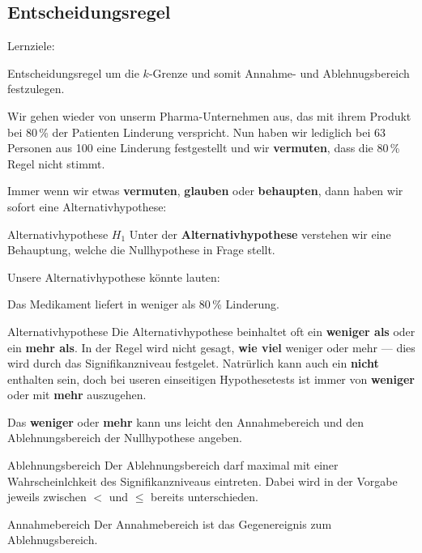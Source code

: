 
\subsection{Entscheidungsregel}
Lernziele:

Entscheidungsregel um die $k$-Grenze und somit Annahme- und
Ablehnugsbereich festzulegen.
\newpage 

Wir gehen wieder von unserm Pharma-Unternehmen aus, das mit ihrem Produkt bei 80\,\% der Patienten Linderung verspricht.
Nun haben wir lediglich bei 63 Personen aus 100 eine Linderung festgestellt und wir \textbf{vermuten}, dass die 80\,\% Regel nicht stimmt.

Immer wenn wir etwas \textbf{vermuten}, \textbf{glauben} oder \textbf{behaupten}, dann haben wir sofort eine Alternativhypothese:


\begin{definition}{Alternativhypothese $H_1$}{}
Unter der \textbf{Alternativhypothese} verstehen wir eine Behauptung, welche die Nullhypothese in Frage stellt.
\end{definition}

Unsere Alternativhypothese könnte lauten:

\begin{center}Das Medikament liefert in weniger als 80\,\% Linderung.\end{center}

\begin{bemerkung}{Alternativhypothese}{}
  Die Alternativhypothese beinhaltet oft ein \textbf{weniger als} oder ein \textbf{mehr als}. In der Regel wird nicht gesagt, \textbf{wie viel} weniger oder mehr --- dies wird durch das Signifikanzniveau festgelet. Natrürlich kann auch ein \textbf{nicht} enthalten sein, doch bei useren einseitigen Hypothesetests ist immer von \textbf{weniger} oder mit \textbf{mehr} auszugehen.
\end{bemerkung}

Das \textbf{weniger} oder \textbf{mehr} kann uns leicht den Annahmebereich und den Ablehnungsbereich der Nullhypothese angeben.

\begin{gesetz}{Ablehnungsbereich}{}
  Der Ablehnungsbereich darf maximal mit einer Wahrscheinlchkeit des Signifikanzniveaus eintreten. Dabei wird in der Vorgabe jeweils zwischen $<$ und $\le$ bereits unterschieden.
\end{gesetz}

\begin{gesetz}{Annahmebereich}{}
  Der Annahmebereich ist das Gegenereignis zum Ablehnugsbereich.
\end{gesetz}


